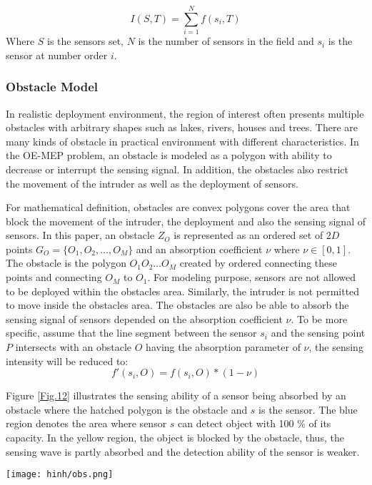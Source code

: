 \documentclass[final]{elsarticle}
\begin{document}
\begin{equation}
\label{eq4}
I(S, T) = \sum\limits_{i = 1}^{N} {f({s_i},T)} 
\end{equation}
Where $ S $ is the sensors set, $ N $ is the number of sensors in the field and $s_i$ is the sensor at number order $ i $.

\subsubsection{Obstacle Model}
In realistic deployment environment, the region of interest often presents multiple obstacles with arbitrary shapes such as lakes, rivers, houses and trees. There are many kinds of obstacle in practical environment with different characteristics. In the OE-MEP problem, an obstacle is modeled as a polygon with ability to decrease or interrupt the sensing signal. In addition, the obstacles also restrict the movement of the intruder as well as the deployment of sensors. 

For mathematical definition, obstacles are convex polygons cover the area that block the movement of the intruder, the deployment and also the sensing signal of sensors. In this paper, an obstacle $Z_O$ is represented as an ordered set of $2D$ points $ G_O = \{O_1, O_2,\ldots,O_M\}$ and an absorption coefficient $\nu$ where $\nu \in [0,1]$. The obstacle is the polygon $O_1 O_2\ldots O_M $ created by ordered connecting these points and connecting $O_M$ to $O_1$. For modeling purpose, sensors are not allowed to be deployed within the obstacles area. Similarly, the intruder is not permitted to move inside the obstacles area. The obstacles are also be able to absorb the sensing signal of sensors depended on the absorption coefficient $\nu$. To be more specific, assume that the line segment between the sensor $s_i$ and the sensing point $ P $ intersects with an obstacle $O$ having the absorption parameter of $\nu$, the sensing intensity will be reduced to: 
\begin{equation}
\label{eq5}
f'(s_i,O) = f(s_i,O) * (1-\nu) 
\end{equation}

Figure \ref{Fig.12} illustrates the sensing ability of a sensor being absorbed by an obstacle where the hatched polygon is the obstacle and $ s $  is the sensor. The blue region denotes the area where sensor $ s $ can detect object with 100 \% of its capacity. In the yellow region, the object is blocked by the obstacle, thus, the sensing wave is partly absorbed and the detection ability of the sensor is weaker.
\begin{figure*}[h]
	\centering
	\texttt{[image: hinh/obs.png]}
	\caption{Sensing ability of a sensor being absorbed by an obstacle}
	\label{Fig.12}       %
\end{figure*}
\end{document}
